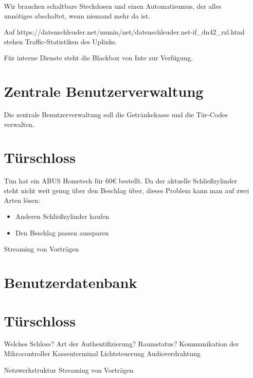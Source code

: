 \documentclass{scrartcl}
\begin{document}
Wir brauchen schaltbare Steckdosen und einen Automatisumus, der alles unnötiges abschaltet, wenn niemand mehr da ist.

Auf https://datenschleuder.net/munin/net/datenschleuder.net-if_dn42_rzl.html stehen Traffic-Statistiken des Uplinks.

Für interne Dienste steht die Blackbox von Inte zur Verfügung.

\section{Zentrale Benutzerverwaltung}

Die zentrale Benutzerverwaltung soll die Getränkekasse und die Tür-Codes verwalten.

\section{Türschloss}

Tim hat ein ABUS Hometech für 60€ bestellt.
Da der aktuelle Schließzylinder steht nicht weit genug über den Beschlag über, dieses Problem kann man auf zwei Arten lösen:
\begin{itemize}
\item{} Anderen Schließzylinder kaufen
\item{} Den Beschlag passen aussparen
\end{itemize}




Streaming von Vorträgen

\section{Benutzerdatenbank}

\section{Türschloss}

Welches Schloss?
Art der Authentifizierung?
Raumstatus?
Kommunikation der Mikrocontroller
Kassenterminal
Lichtsteuerung
Audioverdrahtung

Netzwerkstruktur
Streaming von Vorträgen
\end{document}
